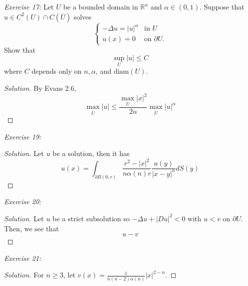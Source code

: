 \documentclass{article}
\newcommand{\exercise}[2]{
\vspace{0.2in}\begin{mdframed}[
  backgroundcolor=problem,
  skipabove=\topsep,
  skipbelow=\topsep
  ]
  \emph{Exercise {#1}:} {#2}
\end{mdframed}}
\newcommand{\R}{\mathbb{R}}
\begin{document}
      \exercise{17}{Let $U$ be a bounded domain in $\R^n$ and $\alpha \in (0,1)$. Suppose that $u\in C^2(U)\cap C(\overline{U})$ solves 
      \[\begin{cases}
        -\Delta u = |u|^\alpha &\text{in } U\\
        u(x) = 0 &\text{on } \partial U.
      \end{cases}\]
      Show that 
      \[ \sup_U|u|\le C\]
      where $C$ depends only on $n,\alpha$, and $\text{diam}(U)$.}
      \begin{proof}[Solution]
        By Evans 2.6, 
        \[\max_{\bar{U}} |u| \le \frac{\max_{\overline{U}}|x|^2}{2n}\max_{\overline{U}}|u|^\alpha\]
      \end{proof}
      \exercise{19}{}
      \begin{proof}[Solution]
        Let $u$ be a solution, then it has
        \[u(x) = \int_{\partial B(0,r)}\frac{r^2-|x|^2}{n\alpha(n)r}\frac{u(y)}{|x-y|^n}dS(y)\]
      \end{proof}
      \exercise{20}{}
      \begin{proof}[Solution]
        Let $u$ be a strict subsolution so $-\Delta u + |Du|^2 < 0$ with $u < v$ on $\partial U$. Then, we see that 
        \[u - v\]
      \end{proof}
      \exercise{21}{}
      \begin{proof}[Solution]
        For $n\ge 3$, let $v(x) = \frac{1}{n(n-2)\alpha(n)}|x|^{2-n}$.
      \end{proof}
    
\end{document}
